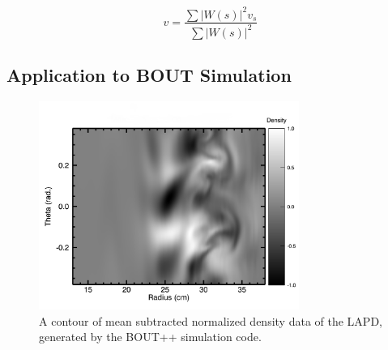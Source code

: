 \documentclass[%
 reprint,
 amsmath,amssymb,
 aps,
]{revtex4-1}
\begin{document}
 \begin{equation} v=\frac{\sum\vert W(s)\vert^2 v_s} {\sum \vert W(s) \vert^2}
\label{eq:three}
\end{equation}


%
%
%
%
\subsection{\label{sec:citeref}Application to BOUT Simulation}

\begin{figure}[!htbp]
\centerline{}
\includegraphics[width=8.5cm]{plot_Bout_contour_for_paper}
\caption{\label{fig:plot_Bout_contour_for_paper} A contour of mean subtracted normalized density data of the LAPD, generated by the BOUT++ simulation code.}
\end{figure}
\end{document}
